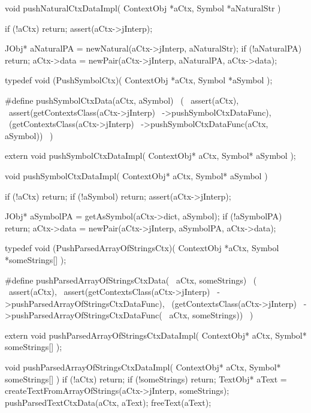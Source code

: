 \startCCode
void pushNaturalCtxDataImpl(
  ContextObj *aCtx,
  Symbol     *aNaturalStr
) {
  if (!aCtx) return;
  assert(aCtx->jInterp);

  JObj* aNaturalPA = newNatural(aCtx->jInterp, aNaturalStr);
  if (!aNaturalPA) return;
  aCtx->data = newPair(aCtx->jInterp, aNaturalPA, aCtx->data);
}
\stopCCode

\startCHeader
typedef void (PushSymbolCtx)(
  ContextObj *aCtx,
  Symbol     *aSymbol
);

#define pushSymbolCtxData(aCtx, aSymbol)      \
  (                                           \
    assert(aCtx),                             \
    assert(getContextsClass(aCtx->jInterp)    \
      ->pushSymbolCtxDataFunc),               \
    (getContextsClass(aCtx->jInterp)          \
      ->pushSymbolCtxDataFunc(aCtx, aSymbol)) \
  )
\stopCHeader

\setCHeaderStream{private}
\startCHeader
extern void pushSymbolCtxDataImpl(
  ContextObj* aCtx,
  Symbol* aSymbol
);
\stopCHeader
\setCHeaderStream{public}

\startCCode
void pushSymbolCtxDataImpl(
  ContextObj* aCtx,
  Symbol* aSymbol
) {
  if (!aCtx) return;
  if (!aSymbol) return;
  assert(aCtx->jInterp);

  JObj* aSymbolPA = getAsSymbol(aCtx->dict, aSymbol);
  if (!aSymbolPA) return;
  aCtx->data = newPair(aCtx->jInterp, aSymbolPA, aCtx->data);
}
\stopCCode

\startCHeader
typedef void (PushParsedArrayOfStringsCtx)(
  ContextObj *aCtx,
  Symbol     *someStrings[]
);

#define pushParsedArrayOfStringsCtxData(      \
  aCtx, someStrings)                          \
  (                                           \
    assert(aCtx),                             \
    assert(getContextsClass(aCtx->jInterp)    \
      ->pushParsedArrayOfStringsCtxDataFunc), \
    (getContextsClass(aCtx->jInterp)          \
      ->pushParsedArrayOfStringsCtxDataFunc(  \
        aCtx, someStrings))                   \
  )
\stopCHeader

\startCHeader
extern void pushParsedArrayOfStringsCtxDataImpl(
  ContextObj* aCtx,
  Symbol* someStrings[]
);
\stopCHeader
\setCHeaderStream{public}

\startCCode
void pushParsedArrayOfStringsCtxDataImpl(
  ContextObj* aCtx,
  Symbol* someStrings[]
) {
  if (!aCtx) return;
  if (!someStrings) return;
  TextObj* aText =
    createTextFromArrayOfStrings(aCtx->jInterp, someStrings);
  pushParsedTextCtxData(aCtx, aText);
  freeText(aText);
}
\stopCCode

